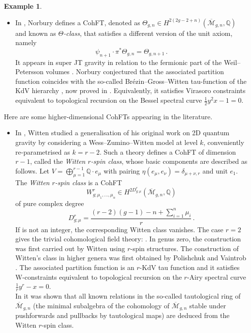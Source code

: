 \documentclass[11pt,reqno]{amsart}
\numberwithin{equation}{section}
\newcommand{\mb}[1]{\mathbb{#1}}
\newcommand{\mc}[1]{\mathcal{#1}}
\newcommand{\Q}{\mb{Q}}
\newcommand{\M}{\mc{M}}
\newcommand{\Mbar}{\overline{\M}}
\theoremstyle{plain}
\theoremstyle{definition}
\newtheorem{example}[theorem]{Example}
\begin{document}
\begin{example}
\begin{itemize}
    \item
    In \cite{Nor23}, Norbury defines a CohFT, denoted as $\Theta_{g,n} \in H^{2(2g-2+n)}(\Mbar_{g,n},\Q)$ and known as \emph{$\Theta$-class}, that satisfies a different version of the unit axiom, namely
    \begin{equation}
      \psi_{n+1} \cdot \pi^{\ast} \Theta_{g,n} = \Theta_{g,n+1} \,.
    \end{equation}
    It appears in super JT gravity in relation to the fermionic part of the Weil--Petersson volumes \cite{SW20}. Norbury conjectured that the associated partition function coincides with the so-called Brézin--Gross--Witten tau-function of the KdV hierarchy \cite{BG80,GW80}, now proved in \cite{CGG25}. Equivalently, it satisfies Virasoro constraints equivalent to topological recursion on the Bessel spectral curve $\frac{1}{2}y^2 x - 1 = 0$.
  \end{itemize}
  Here are some higher-dimensional CohFTs appearing in the literature.
  \begin{itemize}
    \item
    In \cite{Wit92}, Witten studied a generalisation of his original work on 2D quantum gravity by considering a Wess--Zumino--Witten model at level $k$, conveniently re-parametrised as $k = r-2$. Such a theory defines a CohFT of dimension $r-1$, called the \emph{Witten $r$-spin class}, whose basic components are described as follows. Let $V = \bigoplus_{\mu=1}^{r-1} \Q \cdot e_{\mu}$ with pairing $\eta(e_{\mu},e_{\nu}) = \delta_{\mu+\nu,r}$ and unit $e_1$. The \emph{Witten $r$-spin class} is a CohFT
    \begin{equation}
      W_{g;\mu_1,\ldots,\mu_n}^{r} \in H^{2D_{g;\mu}^{r}}(\Mbar_{g,n},\Q)
    \end{equation}
    of pure complex degree
    \begin{equation}
      D_{g;\mu}^{r}
      =
      \frac{(r-2)(g-1) - n + \sum_{i=1}^n \mu_i}{r} \,.
    \end{equation}
    If  is not an integer, the corresponding Witten class vanishes. The case $r = 2$ gives the trivial cohomological field theory: . In genus zero, the construction was first carried out by Witten \cite{Wit93} using $r$-spin structures. The construction of Witten's class in higher genera was first obtained by Polishchuk and Vaintrob \cite{PV00}. The associated partition function is an $r$-KdV tau function \cite{FSZ10} and it satisfies W-constraints equivalent to topological recursion on the $r$-Airy spectral curve $\frac{1}{r}y^r - x = 0$. \\ In \cite{PPZ15} it was shown that all known relations in the so-called tautological ring of $\Mbar_{g,n}$ (the minimal subalgebra of the cohomology of $\Mbar_{g,n}$ stable under pushforwards and pullbacks by tautological maps) are deduced from the Witten $r$-spin class.


\end{itemize}
\end{example}
\end{document}
